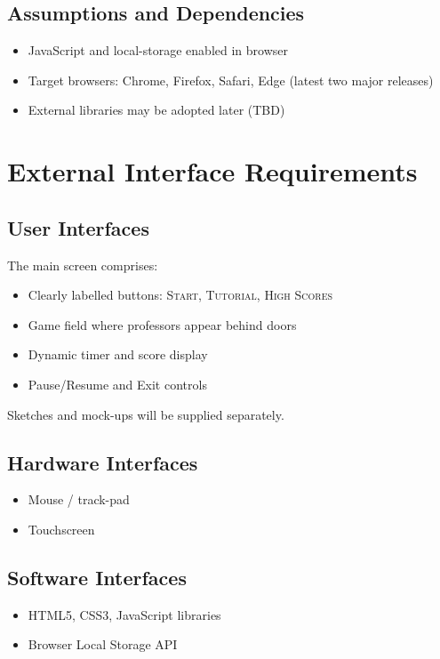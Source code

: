 \documentclass[11pt]{scrreprt}
\begin{document}
\section{Assumptions and Dependencies}
\begin{itemize}
  \item JavaScript and local-storage enabled in browser
  \item Target browsers: Chrome, Firefox, Safari, Edge (latest two major releases)
  \item External libraries may be adopted later (TBD)
\end{itemize}

\chapter{External Interface Requirements}

\section{User Interfaces}
The main screen comprises:
\begin{itemize}
  \item Clearly labelled buttons: \textsc{Start}, \textsc{Tutorial}, \textsc{High Scores}
  \item Game field where professors appear behind doors
  \item Dynamic timer and score display
  \item Pause/Resume and Exit controls
\end{itemize}
Sketches and mock-ups will be supplied separately.

\section{Hardware Interfaces}
\begin{itemize}
  \item Mouse / track-pad
  \item Touchscreen
\end{itemize}

\section{Software Interfaces}
\begin{itemize}
  \item HTML5, CSS3, JavaScript libraries
  \item Browser Local Storage API
\end{itemize}
\end{document}
